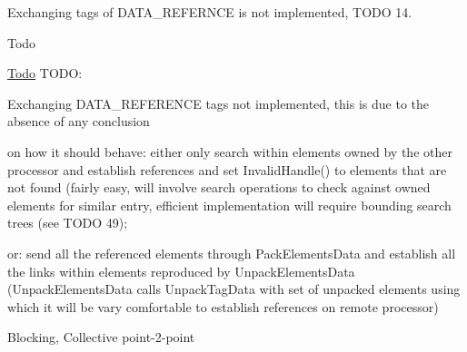 Exchanging tags of D\-A\-T\-A\-\_\-\-R\-E\-F\-E\-R\-N\-C\-E is not implemented, T\-O\-D\-O 14. \begin{DoxyRefDesc}{Todo}
\item[\hyperlink{todo__todo000007}{Todo}]T\-O\-D\-O\-:
\begin{DoxyEnumerate}
\item Exchanging D\-A\-T\-A\-\_\-\-R\-E\-F\-E\-R\-E\-N\-C\-E tags not implemented, this is due to the absence of any conclusion
\end{DoxyEnumerate}
\begin{DoxyItemize}
\item on how it should behave\-: either only search within elements owned by the other processor and establish references and set Invalid\-Handle() to elements that are not found (fairly easy, will involve search operations to check against owned elements for similar entry, efficient implementation will require bounding search trees (see T\-O\-D\-O 49);
\item or\-: send all the referenced elements through Pack\-Elements\-Data and establish all the links within elements reproduced by Unpack\-Elements\-Data (Unpack\-Elements\-Data calls Unpack\-Tag\-Data with set of unpacked elements using which it will be vary comfortable to establish references on remote processor)
\end{DoxyItemize}\end{DoxyRefDesc}


Blocking, Collective point-\/2-\/point


